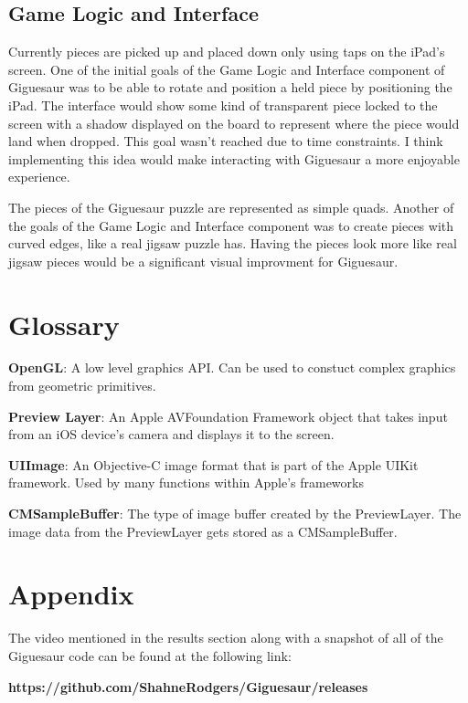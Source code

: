 \documentclass{article}
\begin{document}
\subsection{Game Logic and Interface}
Currently pieces are picked up and placed down only using taps on the iPad's screen. One of the initial goals of the Game Logic and Interface component of Giguesaur was to be able to rotate and position a held piece by positioning the iPad. The interface would show some kind of transparent piece locked to the screen with a shadow displayed on the board to represent where the piece would land when dropped. This goal wasn't reached due to time constraints. I think implementing this idea would make interacting with Giguesaur a more enjoyable experience.

The pieces of the Giguesaur puzzle are represented as simple quads. Another of the goals of the Game Logic and Interface component was to create pieces with curved edges, like a real jigsaw puzzle has. Having the pieces look more like real jigsaw pieces would be a significant visual improvment for Giguesaur.

\newpage
\section{Glossary}
 
\textbf{OpenGL}: A low level graphics API. Can be used to constuct complex graphics from geometric primitives.

\textbf{Preview Layer}: An Apple AVFoundation Framework object that takes input from an iOS device's camera and displays it to the screen.

\textbf{UIImage}: An Objective-C image format that is part of the Apple UIKit framework. Used by many functions within Apple's frameworks

\textbf{CMSampleBuffer}: The type of image buffer created by the PreviewLayer. The image data from the PreviewLayer gets stored as a CMSampleBuffer.


\section{Appendix}\label{appendix_sec}

The video mentioned in the results section along with a snapshot of all of the Giguesaur code can be found at the following link:

\textbf{https://github.com/ShahneRodgers/Giguesaur/releases}

\newpage


\nocite{*}


\end{document}
